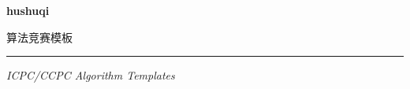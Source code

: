 \begin{titlepage}
\thispagestyle{empty}
\centering
{}

{\fontsize{56}{64}\selectfont\bfseries hushuqi\par}

\vspace{1.4em}
{\Huge 算法竞赛模板\par}

\vspace{2.4em}
\rule{0.55\linewidth}{1.1pt}\par
\vspace{1.1em}
{\Large\itshape ICPC/CCPC Algorithm Templates\par}

\end{titlepage}
\clearpage
